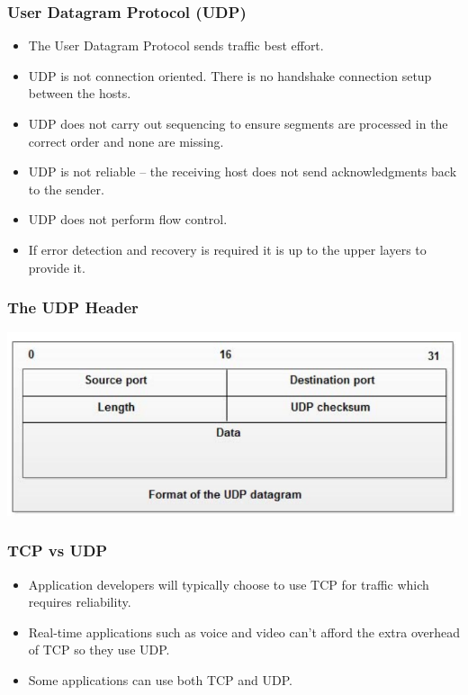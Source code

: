 \documentclass[pdflatex,compress]{beamer}
\begin{document}
\begin{frame}
	\frametitle{User Datagram Protocol (UDP)}
	\begin{itemize}
		\item The User Datagram Protocol sends traffic best effort.
		\item UDP is not connection oriented. There is no handshake connection setup between the hosts.
		\item UDP does not carry out sequencing to ensure segments are processed in the correct order and none are missing.
		\item UDP is not reliable – the receiving host does not send acknowledgments back to the sender.
		\item UDP does not perform flow control.
		\item If error detection and recovery is required it is up to the upper layers to provide it.
	\end{itemize}
\end{frame}

\begin{frame}
	\frametitle{The UDP Header}
	\begin{center}
		\includegraphics[width=\linewidth]{img/img13}
	\end{center}
\end{frame}

\begin{frame}
	\frametitle{TCP vs UDP}
	\begin{itemize}
		\item Application developers will typically choose to use TCP for traffic which requires reliability.
		\item Real-time applications such as voice and video can't afford the extra overhead of TCP so they use UDP.
		\item Some applications can use both TCP and UDP.
	\end{itemize}
\end{frame}
\end{document}

